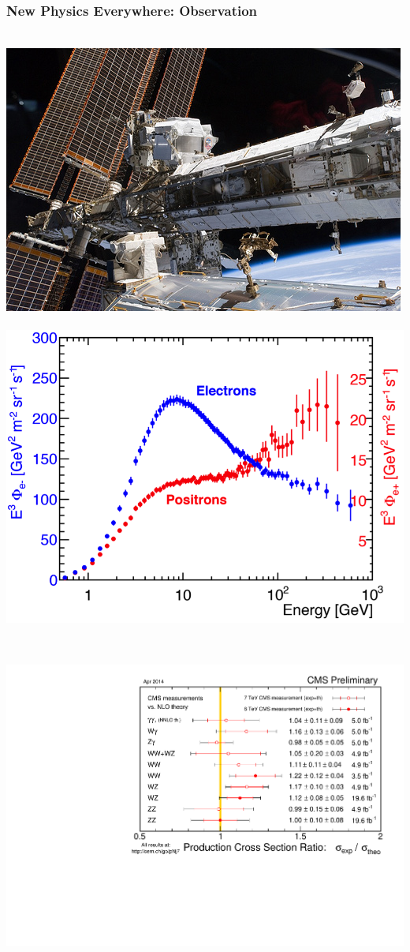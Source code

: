 \documentclass{beamer}
\begin{document}
\begin{frame}
\frametitle{New Physics Everywhere: Observation}
 \vspace{-0.1cm}
\begin{minipage}[b]{0.90\linewidth}
   \begin{tcolorbox}[colback=UNL@Cream!5,colframe=UNL@Cream!60,title=\textcolor{UMN@Maroon}{\textbf{AMS Experiment on ISS}}]
       \mbox{
            \includegraphics[height=0.40\linewidth,width=0.45\linewidth]{THESISPLOTS/New-Physics-PLOTS/AMS-ON-ISS.jpg} \quad \quad 
           \includegraphics[height=0.40\linewidth,width=0.60\linewidth]{THESISPLOTS/New-Physics-PLOTS/AMS-Electron-Positron-Flux-Difference.png} \quad
}
   \end{tcolorbox}
\end{minipage}
 
 
\begin{minipage}[t]{0.80\paperwidth}
\vspace{-0.1cm}
  \begin{columns}
    \begin{column}{0.50\linewidth}
        \begin{tcolorbox}[colback=UNL@Cream!5,colframe=UNL@Cream!60,title=\textcolor{UMN@Maroon}{\textbf{$ZZ$, $WW$ Production}}]     
            \mbox{\includegraphics[height=0.40\linewidth,width=\linewidth]{THESISPLOTS/New-Physics-PLOTS/SigmaR_v5.pdf}}            
         \end{tcolorbox}
   \end{column} 
   

\end{columns}
\end{minipage}
\end{frame}
\end{document}
